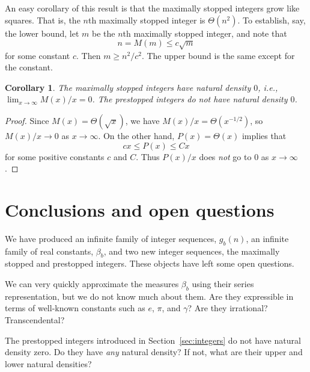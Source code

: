 \documentclass[12pt]{amsart}
\newtheorem{corollary}{Corollary}
\theoremstyle{definition}
\begin{document}
An easy corollary of this result is that the maximally stopped integers grow
like squares. That is, the $n$th maximally stopped integer is $\Theta(n^2)$. To
establish, say, the lower bound, let $m$ be the $n$th maximally stopped
integer, and note that
\begin{equation*}
    n = M(m) \leq c \sqrt{m}
\end{equation*}
for some constant $c$. Then $m \geq n^2 / c^2$. The upper bound is the same
except for the constant.

\begin{corollary}
    The maximally stopped integers have natural density $0$, i.e., $\lim_{x \to
    \infty} M(x) / x = 0$. The prestopped integers do not have natural density
    $0$.
\end{corollary}

\begin{proof}
    Since $M(x) = \Theta(\sqrt{x})$, we have $M(x) / x = \Theta(x^{-1/2})$, so
    $M(x) / x \to 0$ as $x \to \infty$. On the other hand, $P(x) = \Theta(x)$
    implies that
    \begin{equation*}
        cx \leq P(x) \leq Cx
    \end{equation*}
    for some positive constants $c$ and $C$. Thus $P(x) / x$ does \emph{not} go
    to $0$ as $x \to \infty$.
\end{proof}

\section{Conclusions and open questions}%
\label{sec:conclusion}

We have produced an infinite family of integer sequences, $g_b(n)$, an infinite
family of real constants, $\beta_b$, and two new integer sequences, the
maximally stopped and prestopped integers. These objects have left some open
questions.

We can very quickly approximate the measures $\beta_b$ using their series
representation, but we do not know much about them. Are they expressible in
terms of well-known constants such as $e$, $\pi$, and $\gamma$? Are they
irrational? Transcendental?

The prestopped integers introduced in Section~\ref{sec:integers} do not have
natural density zero. Do they have \emph{any} natural density? If not, what are
their upper and lower natural densities?



\end{document}
